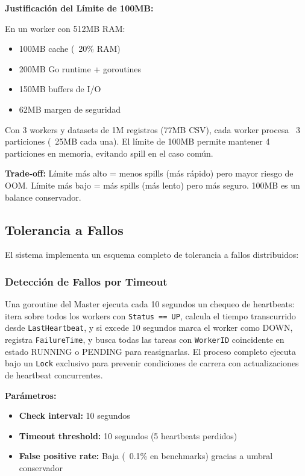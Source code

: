 \documentclass[conference]{IEEEtran}
\begin{document}
\textbf{Justificación del Límite de 100MB:}

En un worker con 512MB RAM:
\begin{itemize}
\item 100MB cache (~20\% RAM)
\item 200MB Go runtime + goroutines
\item 150MB buffers de I/O
\item 62MB margen de seguridad
\end{itemize}

Con 3 workers y datasets de 1M registros (77MB CSV), cada worker procesa ~3 particiones (~25MB cada una). El límite de 100MB permite mantener 4 particiones en memoria, evitando spill en el caso común.

\textbf{Trade-off:} Límite más alto = menos spills (más rápido) pero mayor riesgo de OOM. Límite más bajo = más spills (más lento) pero más seguro. 100MB es un balance conservador.

\subsection{Tolerancia a Fallos}

El sistema implementa un esquema completo de tolerancia a fallos distribuidos:

\subsubsection{Detección de Fallos por Timeout}

Una goroutine del Master ejecuta cada 10 segundos un chequeo de heartbeats: itera sobre todos los workers con \texttt{Status == UP}, calcula el tiempo transcurrido desde \texttt{LastHeartbeat}, y si excede 10 segundos marca el worker como DOWN, registra \texttt{FailureTime}, y busca todas las tareas con \texttt{WorkerID} coincidente en estado RUNNING o PENDING para reasignarlas. El proceso completo ejecuta bajo un \texttt{Lock} exclusivo para prevenir condiciones de carrera con actualizaciones de heartbeat concurrentes.

\textbf{Parámetros:}
\begin{itemize}
\item \textbf{Check interval:} 10 segundos
\item \textbf{Timeout threshold:} 10 segundos (5 heartbeats perdidos)
\item \textbf{False positive rate:} Baja (~0.1\% en benchmarks) gracias a umbral conservador
\end{itemize}
\end{document}
